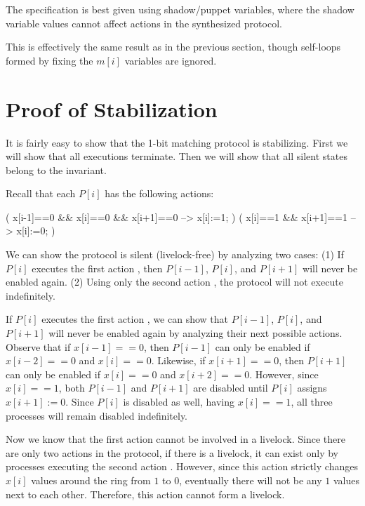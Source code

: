 The specification is best given using shadow/puppet variables, where the shadow variable values cannot affect actions in the synthesized protocol.

This is effectively the same result as in the previous section, though self-loops formed by fixing the $m[i]$ variables are ignored.

\section{Proof of Stabilization}

It is fairly easy to show that the 1-bit matching protocol is stabilizing.
First we will show that all executions terminate.
Then we will show that all silent states belong to the invariant.

Recall that each $P[i]$ has the following actions:
\begin{code}
( x[i-1]==0 && x[i]==0 && x[i+1]==0 --> x[i]:=1; )
(              x[i]==1 && x[i+1]==1 --> x[i]:=0; )
\end{code}

We can show the protocol is silent (livelock-free) by analyzing two cases:
(1) If $P[i]$ executes the first action , then $P[i-1]$, $P[i]$, and $P[i+1]$ will never be enabled again.
(2) Using only the second action , the protocol will not execute indefinitely.

If $P[i]$ executes the first action , we can show that $P[i-1]$, $P[i]$, and $P[i+1]$ will never be enabled again by analyzing their next possible actions.
Observe that if $x[i-1]==0$, then $P[i-1]$ can only be enabled if $x[i-2]==0$ and $x[i]==0$.
Likewise, if $x[i+1]==0$, then $P[i+1]$ can only be enabled if $x[i]==0$ and $x[i+2]==0$.
However, since $x[i]==1$, both $P[i-1]$ and $P[i+1]$ are disabled until $P[i]$ assigns $x[i+1]:=0$.
Since $P[i]$ is disabled as well, having $x[i]==1$, all three processes will remain disabled indefinitely.

Now we know that the first action cannot be involved in a livelock.
Since there are only two actions in the protocol, if there is a livelock, it can exist only by processes executing the second action .
However, since this action strictly changes $x[i]$ values around the ring from $1$ to $0$, eventually there will not be any $1$ values next to each other.
Therefore, this action cannot form a livelock.


